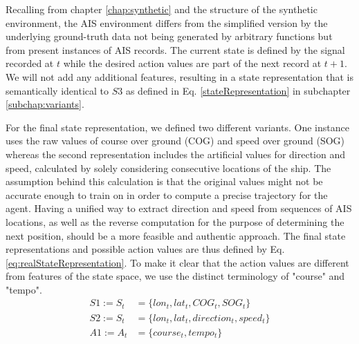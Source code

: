 Recalling from chapter \ref{chap:synthetic} and the structure of the synthetic environment, the AIS environment differs from the simplified version by the underlying ground-truth data not being generated by arbitrary functions but from present instances of AIS records. The current state is defined by the signal recorded at $t$ while the desired action values are part of the next record at $t+1$. We will not add any additional features, resulting in a state representation that is semantically identical to $S3$ as defined in Eq. \ref{stateRepresentation} in subchapter \ref{subchap:variants}.
\par
For the final state representation, we defined two different variants. One instance uses the raw values of course over ground (COG) and speed over ground (SOG) whereas the second representation includes the artificial values for direction and speed, calculated by solely considering consecutive locations of the ship. The assumption behind this calculation is that the original values might not be accurate enough to train on in order to compute a precise trajectory for the agent. Having a unified way to extract direction and speed from sequences of AIS locations, as well as the reverse computation for the purpose of determining the next position, should be a more feasible and authentic approach. The final state representations and possible action values are thus defined by Eq. \ref{eq:realStateRepresentation}. 
\newpage
To make it clear that the action values are different from features of the state space, we use the distinct terminology of "course" and "tempo".
\begin{equation}
\begin{aligned}
    S1 := S_t &= \{lon_t, lat_t, COG_t, SOG_t\}
\\
    S2 := S_t &= \{lon_t,lat_t, direction_t, speed_t\}
\\
    A1 := A_t &= \{course_t, tempo_t\}
    \end{aligned}
    \label{eq:realStateRepresentation}
\end{equation} 

